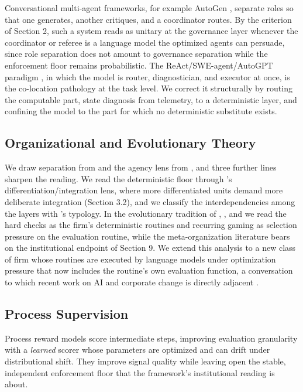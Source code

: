 \documentclass[11pt]{article}
\begin{document}
Conversational multi-agent frameworks, for example AutoGen \citep{wu2023}, separate roles so that one generates, another critiques, and a coordinator routes. By the criterion of Section 2, such a system reads as unitary at the governance layer whenever the coordinator or referee is a language model the optimized agents can persuade, since role separation does not amount to governance separation while the enforcement floor remains probabilistic. The ReAct/SWE-agent/AutoGPT paradigm \citep{yao2023react,yang2024swe,richards2023autogpt}, in which the model is router, diagnostician, and executor at once, is the co-location pathology at the task level. We correct it structurally by routing the computable part, state diagnosis from telemetry, to a deterministic layer, and confining the model to the part for which no deterministic substitute exists.

\subsection{Organizational and Evolutionary Theory}

We draw separation from \citet{chandler1962} and the agency lens from \citet{jensen1976}, and three further lines sharpen the reading. We read the deterministic floor through \citet{lawrence1967}'s differentiation/integration lens, where more differentiated units demand more deliberate integration (Section 3.2), and we classify the interdependencies among the layers with \citet{thompson1967}'s typology. In the evolutionary tradition of \citet{nelson1982}, \citet{dosi1982}, and \citet{teece1997} we read the hard checks as the firm's deterministic routines and recurring gaming as selection pressure on the evaluation routine, while the meta-organization literature \citep{ahrne2008,berkowitz2016} bears on the institutional endpoint of Section 9. We extend this analysis to a new class of firm whose routines are executed by language models under optimization pressure that now includes the routine's own evaluation function, a conversation to which recent work on AI and corporate change is directly adjacent \citep{schrepel2025,glaser2024}.

\subsection{Process Supervision}

Process reward models \citep{lightman2023} score intermediate steps, improving evaluation granularity with a \emph{learned} scorer whose parameters are optimized and can drift under distributional shift. They improve signal quality while leaving open the stable, independent enforcement floor that the framework's institutional reading is about.
\end{document}
